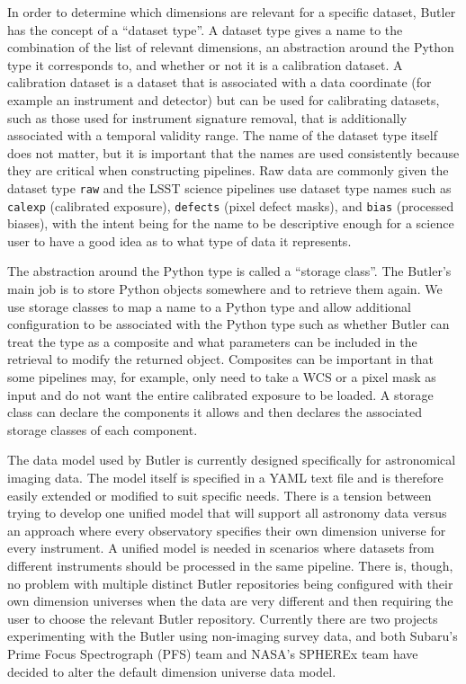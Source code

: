 \documentclass[]{spie}
\begin{document}
In order to determine which dimensions are relevant for a specific dataset, Butler has the concept of a ``dataset type''.
A dataset type gives a name to the combination of the list of relevant dimensions, an abstraction around the Python type it corresponds to, and whether or not it is a calibration dataset.
A calibration dataset is a dataset that is associated with a data coordinate (for example an instrument and detector) but can be used for calibrating datasets, such as those used for instrument signature removal, that is additionally associated with a temporal validity range.
The name of the dataset type itself does not matter, but it is important that the names are used consistently because they are critical when constructing pipelines.
Raw data are commonly given the dataset type \texttt{raw} and the LSST science pipelines use dataset type names such as \texttt{calexp} (calibrated exposure), \texttt{defects} (pixel defect masks), and \texttt{bias} (processed biases), with the intent being for the name to be descriptive enough for a science user to have a good idea as to what type of data it represents.

The abstraction around the Python type is called a ``storage class''.
The Butler's main job is to store Python objects somewhere and to retrieve them again.
We use storage classes to map a name to a Python type and allow additional configuration to be associated with the Python type such as whether Butler can treat the type as a composite and what parameters can be included in the retrieval to modify the returned object.
Composites can be important in that some pipelines may, for example, only need to take a WCS or a pixel mask as input and do not want the entire calibrated exposure to be loaded.
A storage class can declare the components it allows and then declares the associated storage classes of each component.

The data model used by Butler is currently designed specifically for astronomical imaging data.
The model itself is specified in a YAML text file and is therefore easily extended or modified to suit specific needs.
There is a tension between trying to develop one unified model that will support all astronomy data versus an approach where every observatory specifies their own dimension universe for every instrument.
A unified model is needed in scenarios where datasets from different instruments should be processed in the same pipeline.
There is, though, no problem with multiple distinct Butler repositories being configured with their own dimension universes when the data are very different and then requiring the user to choose the relevant Butler repository.
Currently there are two projects experimenting with the Butler using non-imaging survey data, and both Subaru's Prime Focus Spectrograph (PFS) team\cite{2020SPIE11447E..7VW} and NASA's SPHEREx team\cite{2020SPIE11443E..0IC} have decided to alter the default dimension universe data model.
\end{document}
